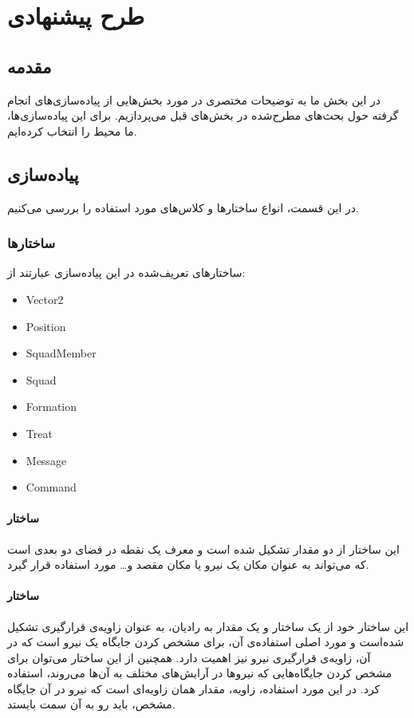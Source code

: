 \newpage
\chapter{طرح پیشنهادی}
\newpage
\section{مقدمه}
در این بخش ما به توضیحات مختصری در مورد بخش‌هایی از پیاده‌سازی‌های انجام گرفته حول بحث‌های مطرح‌شده در
بخش‌های قبل می‌پردازیم. برای این پیاده‌سازی‌ها، ما محیط
را انتخاب کرده‌ایم.
\section{پیاده‌سازی}
در این قسمت، انواع ساختارها و کلاس‌های مورد استفاده را بررسی می‌کنیم.
\subsection{ساختارها}
ساختارهای تعریف‌شده در این پیاده‌سازی عبارتند از:
\begin{latin}
\begin{itemize}
  \item Vector2
  \item Position
  \item SquadMember
  \item Squad
  \item Formation
  \item Treat
  \item Message
  \item Command
\end{itemize}
\end{latin}

\subsubsection{ساختار }
این ساختار از دو مقدار  تشکیل شده است و  معرف یک نقطه در فضای دو بعدی است که می‌تواند
به عنوان مکان یک نیرو یا مکان مقصد و… مورد استفاده قرار گیرد.
\subsubsection{ساختار }
این ساختار خود از یک ساختار  و یک مقدار  به رادیان، به عنوان زاویه‌ی قرارگیری
تشکیل شده‌است و مورد اصلی استفاده‌ی آن، برای مشخص کردن جایگاه یک نیرو است که در آن، زاویه‌ی قرارگیری نیرو
نیز اهمیت دارد. همچنین از این ساختار می‌توان برای مشخص کردن جایگاه‌هایی که نیروها در آرایش‌های مختلف به آن‌ها
می‌روند، استفاده کرد. در این مورد استفاده، زاویه، مقدار همان زاویه‌ای است که نیرو در آن جایگاه مشخص، باید
رو به آن سمت بایستد.

